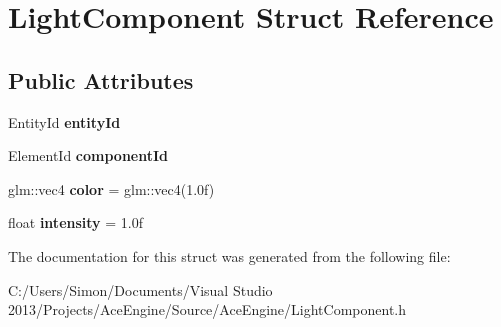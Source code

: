 \hypertarget{struct_light_component}{}\section{Light\+Component Struct Reference}
\label{struct_light_component}
\subsection*{Public Attributes}
\begin{DoxyCompactItemize}
\item 
\hypertarget{struct_light_component_a488a27dbc5dd869dffc4e8e3e25a7ef7}{}Entity\+Id {\bfseries entity\+Id}\label{struct_light_component_a488a27dbc5dd869dffc4e8e3e25a7ef7}

\item 
\hypertarget{struct_light_component_ad6ecbea68301f9e35315a72a3508b62a}{}Element\+Id {\bfseries component\+Id}\label{struct_light_component_ad6ecbea68301f9e35315a72a3508b62a}

\item 
\hypertarget{struct_light_component_a88067da3b3de94d56f4c871635ebce48}{}glm\+::vec4 {\bfseries color} = glm\+::vec4(1.\+0f)\label{struct_light_component_a88067da3b3de94d56f4c871635ebce48}

\item 
\hypertarget{struct_light_component_a9f90a93fd09511fd414e77e153d87678}{}float {\bfseries intensity} = 1.\+0f\label{struct_light_component_a9f90a93fd09511fd414e77e153d87678}

\end{DoxyCompactItemize}


The documentation for this struct was generated from the following file\+:\begin{DoxyCompactItemize}
\item 
C\+:/\+Users/\+Simon/\+Documents/\+Visual Studio 2013/\+Projects/\+Ace\+Engine/\+Source/\+Ace\+Engine/Light\+Component.\+h\end{DoxyCompactItemize}
